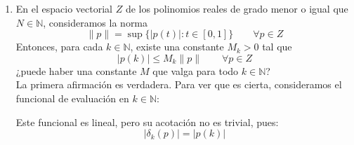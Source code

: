 \documentclass[12pt]{article}
\begin{document}
\begin{ejercicio}
\begin{enumerate}
            Consideramos ahora el vector $u\in l_2$ normalizado dado por:
            \begin{equation*}
                u(n) = \frac{y(n)}{\|y\|} \qquad \forall n\in \mathbb{N}
            \end{equation*}

            Claramente, $\|u\| = 1$, y además:
            \begin{align*}
                |\varphi(u)| &= \left|\sum_{n=1}^{\infty} u(n)y(n)\right| = \left|\sum_{n=1}^{\infty} \frac{y(n)}{\|y\|}y(n)\right| = \frac{1}{\|y\|}\left|\sum_{n=1}^{\infty} y(n)^2\right| = \frac{1}{\|y\|}\|y\|^2 = \|y\|
            \end{align*}

            Por tanto, $\varphi$ alcanza su norma, y como $\varphi$ era arbitrario, todo funcional lineal y continuo de $l_2$ alcanza su norma. Por tanto, todo hiperplano cerrado de $l_2$ es proximinal, y como $\dim(l_2) = \infty$, el resultado es falso.\\

            De hecho, en un ejercicio de las relaciones se probó que, para $1< p < \infty$, todo funcional lineal y continuo de $l_p$ alcanza su norma, y como $\dim(l_p) = \infty$, el resultado es falso para todo $1<p<\infty$.

            \item En el espacio vectorial $Z$ de los polinomios reales de grado menor o igual que $N\in \mathbb{N}$, consideramos la norma
                \begin{equation*}
                    \|p\| = \sup\{|p(t)| : t\in [0,1]\} \qquad \forall p\in Z
                \end{equation*}
                Entonces, para cada $k\in \mathbb{N}$, existe una constante $M_k>0$ tal que
                \begin{equation*}
                    |p(k)| \leq M_k\|p\| \qquad \forall p\in Z
                \end{equation*}
                ¿puede haber una constante $M$ que valga para todo $k\in \mathbb{N}$?\\

                La primera afirmación es verdadera. Para ver que es cierta, consideramos el funcional de evaluación en $k\in \mathbb{N}$:

                Este funcional es lineal, pero su acotación no es trivial, pues:
                \begin{equation*}
                    |\delta_k(p)| = |p(k)|
                \end{equation*}


\end{enumerate}
\end{ejercicio}
\end{document}
